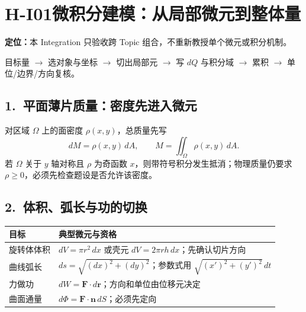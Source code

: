 \documentclass[UTF8,a4paper,10pt]{ctexart}
\begin{document}
\section*{H-I01\quad 微积分建模：从局部微元到整体量}
\textbf{定位：}本 Integration 只验收跨 Topic 组合，不重新教授单个微元或积分机制。
\begin{tcolorbox}[title=母流程]
目标量 $\longrightarrow$ 选对象与坐标 $\longrightarrow$ 切出局部元
$\longrightarrow$ 写 $dQ$ 与积分域 $\longrightarrow$ 累积
$\longrightarrow$ 单位/边界/方向复核。
\end{tcolorbox}
\begin{center}
\end{center}
\subsection*{1.\ 平面薄片质量：密度先进入微元}
对区域 $\Omega$ 上的面密度 $\rho(x,y)$，总质量先写
\[
dM=\rho(x,y)\,dA,\qquad M=\iint_{\Omega}\rho(x,y)\,dA.
\]
若 $\Omega$ 关于 $y$ 轴对称且 $\rho$ 为奇函数 $x$，则带符号积分发生抵消；物理质量仍要求 $\rho\ge0$，必须先检查题设是否允许该密度。
\subsection*{2.\ 体积、弧长与功的切换}
\begin{tabularx}{\linewidth}{@{}lX@{}}
\toprule
目标 & 典型微元与资格\\ \midrule
旋转体体积 & $dV=\pi r^2\,dx$ 或壳元 $dV=2\pi r h\,dx$；先确认切片方向\\
曲线弧长 & $ds=\sqrt{(dx)^2+(dy)^2}$；参数式用 $\sqrt{(x')^2+(y')^2}\,dt$\\
力做功 & $dW=\mathbf F\cdot d\mathbf r$；方向和单位由位移元决定\\
曲面通量 & $d\Phi=\mathbf F\cdot\mathbf n\,dS$；必须先定向\\
\bottomrule
\end{tabularx}
\end{document}
